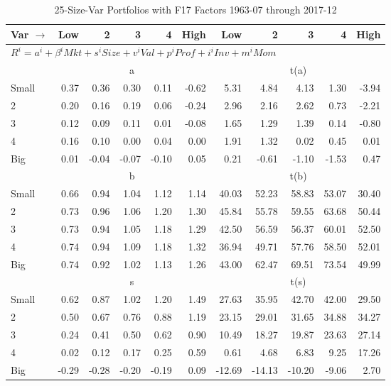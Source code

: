 
\begin{table}[!ht]
\footnotesize
\centering
\caption{25-Size-Var Portfolios with F17 Factors 1963-07 through 2017-12}
\begin{tabular}{lrrrrrrrrrr}
  \toprule
    
    Var $\rightarrow$ & Low & 2 & 3 & 4 & High & Low & 2 & 3 & 4 & High  \\ 
  \midrule
  \multicolumn{11}{l}{$R^i=a^i+\beta^iMkt+s^iSize+v^iVal+p^iProf+i^iInv+m^iMom$}  \\
  
     & \multicolumn{5}{c}{a} & \multicolumn{5}{c}{t(a)}   \\
     \cmidrule(r){2-6} \cmidrule(r){7-11} 
    Small  & 0.37  & 0.36  & 0.30  & 0.11  & -0.62  & 5.31  & 4.84  & 4.13  & 1.30  & -3.94   \\
    2  & 0.20  & 0.16  & 0.19  & 0.06  & -0.24  & 2.96  & 2.16  & 2.62  & 0.73  & -2.21   \\
    3  & 0.12  & 0.09  & 0.11  & 0.01  & -0.08  & 1.65  & 1.29  & 1.39  & 0.14  & -0.80   \\
    4  & 0.16  & 0.10  & 0.00  & 0.04  & 0.00  & 1.91  & 1.32  & 0.02  & 0.45  & 0.01   \\
    Big  & 0.01  & -0.04  & -0.07  & -0.10  & 0.05  & 0.21  & -0.61  & -1.10  & -1.53  & 0.47   \\
    
  
     & \multicolumn{5}{c}{b} & \multicolumn{5}{c}{t(b)}   \\
     \cmidrule(r){2-6} \cmidrule(r){7-11} 
    Small  & 0.66  & 0.94  & 1.04  & 1.12  & 1.14  & 40.03  & 52.23  & 58.83  & 53.07  & 30.40   \\
    2  & 0.73  & 0.96  & 1.06  & 1.20  & 1.30  & 45.84  & 55.78  & 59.55  & 63.68  & 50.44   \\
    3  & 0.73  & 0.94  & 1.05  & 1.18  & 1.29  & 42.50  & 56.59  & 56.37  & 60.01  & 52.50   \\
    4  & 0.74  & 0.94  & 1.09  & 1.18  & 1.32  & 36.94  & 49.71  & 57.76  & 58.50  & 52.01   \\
    Big  & 0.74  & 0.92  & 1.02  & 1.13  & 1.26  & 43.00  & 62.47  & 69.51  & 73.54  & 49.99   \\
    
  
     & \multicolumn{5}{c}{s} & \multicolumn{5}{c}{t(s)}   \\
     \cmidrule(r){2-6} \cmidrule(r){7-11} 
    Small  & 0.62  & 0.87  & 1.02  & 1.20  & 1.49  & 27.63  & 35.95  & 42.70  & 42.00  & 29.50   \\
    2  & 0.50  & 0.67  & 0.76  & 0.88  & 1.19  & 23.15  & 29.01  & 31.65  & 34.88  & 34.27   \\
    3  & 0.24  & 0.41  & 0.50  & 0.62  & 0.90  & 10.49  & 18.27  & 19.87  & 23.63  & 27.14   \\
    4  & 0.02  & 0.12  & 0.17  & 0.25  & 0.59  & 0.61  & 4.68  & 6.83  & 9.25  & 17.26   \\
    Big  & -0.29  & -0.28  & -0.20  & -0.19  & 0.09  & -12.69  & -14.13  & -10.20  & -9.06  & 2.70   \\
    

\end{tabular}
\end{table}
